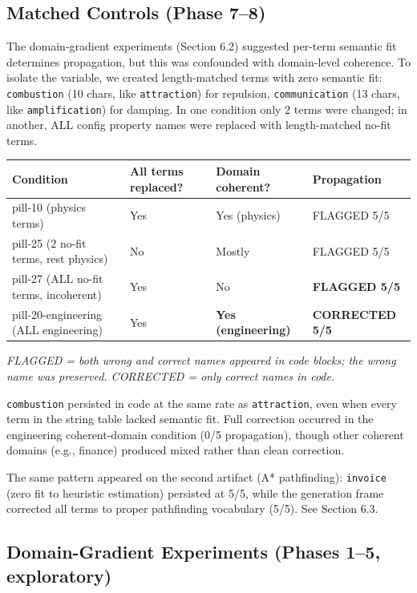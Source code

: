 \documentclass[11pt]{article}
\begin{document}
\subsection{Matched Controls (Phase 7--8)}

The domain-gradient experiments (Section 6.2) suggested per-term
semantic fit determines propagation, but this was confounded with
domain-level coherence. To isolate the variable, we created
length-matched terms with zero semantic fit:
\texttt{combustion} (10 chars, like \texttt{attraction}) for repulsion,
\texttt{communication} (13 chars, like \texttt{amplification}) for damping. In one
condition only 2 terms were changed; in another, ALL config property
names were replaced with length-matched no-fit terms.

\begin{table}[ht]
\centering
\small
\begin{tabular}{@{}llll@{}}
\toprule
Condition & All terms replaced? & Domain coherent? & Propagation \\
\midrule
pill-10 (physics terms) & Yes & Yes (physics) & FLAGGED 5/5 \\
pill-25 (2 no-fit terms, rest physics) & No & Mostly & FLAGGED 5/5 \\
pill-27 (ALL no-fit terms, incoherent) & Yes & No & \textbf{FLAGGED 5/5} \\
pill-20-engineering (ALL engineering) & Yes & \textbf{Yes (engineering)} & \textbf{CORRECTED 5/5} \\
\bottomrule
\end{tabular}
\end{table}

\textit{FLAGGED = both wrong and correct names appeared in code blocks;
the wrong name was preserved. CORRECTED = only correct names in code.}

\texttt{combustion} persisted in code at the same rate as \texttt{attraction}, even
when every term in the string table lacked semantic fit. Full
correction occurred in the engineering coherent-domain condition
(0/5 propagation), though other coherent domains (e.g., finance)
produced mixed rather than clean correction.

The same pattern appeared on the second artifact (A* pathfinding):
\texttt{invoice} (zero fit to heuristic estimation) persisted at 5/5, while
the generation frame corrected all terms to proper pathfinding
vocabulary (5/5). See Section 6.3.

\subsection{Domain-Gradient Experiments (Phases 1--5, exploratory)}
\end{document}
